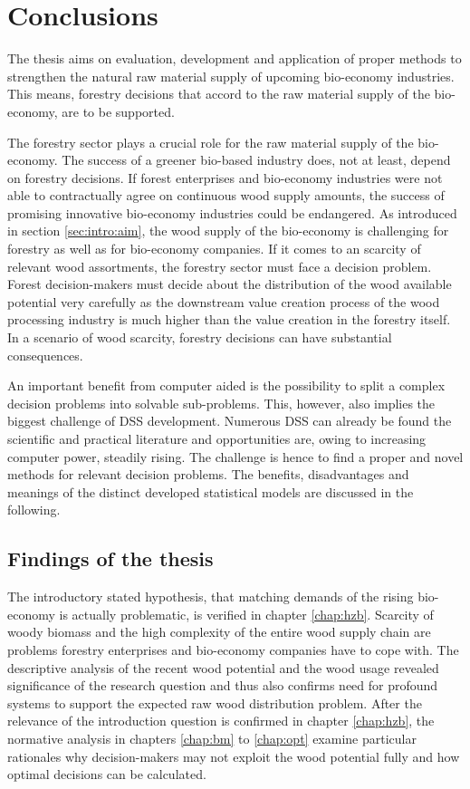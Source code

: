 \chapter{Conclusions}
\label{chap:discussion}
\newpage
\noindent
The thesis aims on evaluation, development and application of proper methods to strengthen the natural raw material supply of upcoming bio-economy industries. This means, forestry decisions that accord to the raw material supply of the bio-economy, are to be supported.

The forestry sector plays a crucial role for the raw material supply of the bio-economy. The success of a greener bio-based industry does, not at least, depend on forestry decisions. If forest enterprises and bio-economy industries were not able to contractually agree on continuous wood supply amounts, the success of promising innovative bio-economy industries could be endangered. As introduced in section \ref{sec:intro:aim}, the wood supply of the bio-economy is challenging for forestry as well as for bio-economy companies. If it comes to an scarcity of relevant wood assortments, the forestry sector must face a decision problem. Forest decision-makers must decide about the distribution of the wood available potential very carefully as the downstream value creation process of the wood processing industry is much higher than the value creation in the forestry itself. In a scenario of wood scarcity, forestry decisions can have substantial consequences.

An important benefit from computer aided is the possibility to split a complex decision problems into solvable sub-problems. This, however, also implies the biggest challenge of DSS development. Numerous DSS can already be found the scientific and practical literature and opportunities are, owing to increasing computer power, steadily rising. The challenge is hence to find a proper and novel methods for relevant decision problems. The benefits, disadvantages and meanings of the distinct developed statistical models are discussed in the following.

\section{Findings of the thesis}
\label{sec:discussion:findings}
The introductory stated hypothesis, that matching demands of the rising bio-economy is actually problematic, is verified in chapter \ref{chap:hzb}. Scarcity of woody biomass and the high complexity of the entire wood supply chain are problems forestry enterprises and bio-economy companies have to cope with. The descriptive analysis of the recent wood potential and the wood usage revealed significance of the research question and thus also confirms need for profound systems to support the expected raw wood distribution problem. After the relevance of the introduction question is confirmed in chapter \ref{chap:hzb}, the normative analysis in chapters \ref{chap:bm} to \ref{chap:opt} examine particular rationales why decision-makers may not exploit the wood potential fully and how optimal decisions can be calculated.

